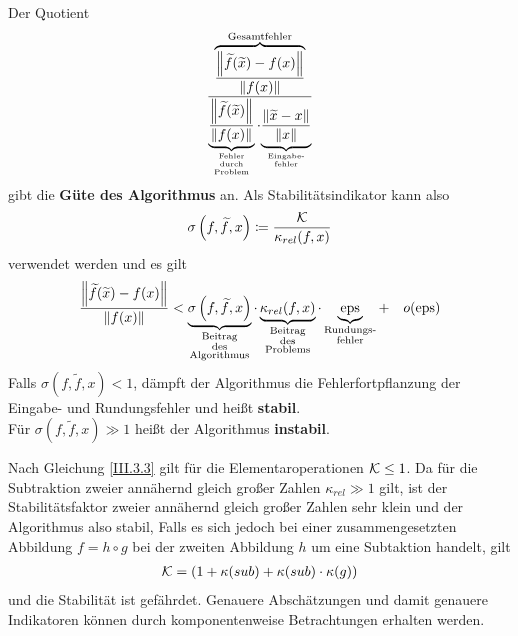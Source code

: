 \begin{Beme}[Sprechweise]\label{3.3.8}
  Der Quotient 
  \begin{gather}
    \frac{\overbrace{\frac{\nn[\widetilde{f}(\widetilde{x})-f(x)]}{\nn[f(x)]}}^{
        \text{Gesamtfehler}}}
    {\underbrace{\frac{\nn[\widetilde{f}(\widetilde{x})]}{\nn[f(x)]}}_{
        \scriptsize\substack{
          \text{Fehler} \\
          \text{durch} \\
          \text{Problem}
        }}
      \cdot
      {\underbrace{\frac{\nn[\widetilde{x}-x]}{\nn[x]}}_{
          \scriptsize\substack{\text{Eingabe-} \\ \text{fehler}}}}}
    \label{III.3.6}
  \end{gather}
  gibt die \textbf{Güte des Algorithmus}  an.
  Als Stabilitätsindikator kann also 
  \begin{gather}
    \sigma\left(f, \widetilde{f}, x\right) \coloneqq \frac{\K}{\kappa_{rel}(f, x)}
    \label{III.3.7}
  \end{gather}
  verwendet werden und es gilt
  \begin{gather*}
    \frac{\nn[\widetilde{f}(\widetilde{x})-f(x)]}{\nn[f(x)]}
    < \underbrace{\sigma\left( f,\widetilde{f}, x\right) }_{
      \substack{\text{Beitrag}\\
        \text{des} \\
        \text{Algorithmus}}}
    \cdot \underbrace{\kappa_{rel}(f,x)}_{
      \substack{\text{Beitrag} \\
        \text{des} \\
        \text{Problems}}}
    \cdot \underbrace{\Eps}_{\substack{\text{Rundungs-}\\\text{fehler}}}
    + \quad o(\Eps)
  \end{gather*}
  Falls $\sigma( f,\widetilde{f}, x)  < 1$, dämpft der Algorithmus die Fehlerfortpflanzung der Eingabe- und Rundungsfehler und heißt \textbf{stabil}. \\
  Für $\sigma( f,\widetilde{f}, x)  \gg 1$ heißt der Algorithmus \textbf{instabil}.
\end{Beme}



\begin{Bspe}
  Nach Gleichung \eqref{III.3.3} gilt für die Elementaroperationen $\K\leq 1$.
  Da für die Subtraktion zweier annähernd gleich großer Zahlen $\kappa_{rel}\gg 1$ gilt,
  ist der Stabilitätsfaktor zweier annähernd gleich großer
  Zahlen sehr klein und der Algorithmus also stabil,
  Falls es sich jedoch bei einer zusammengesetzten Abbildung $f=h\circ g$
  bei der zweiten Abbildung $h$ um eine Subtaktion handelt, gilt
  \begin{gather*}
    \K =(1+\kappa(sub)+\kappa(sub)\cdot\kappa(g))
  \end{gather*}
  und die Stabilität ist gefährdet.
  Genauere Abschätzungen und damit genauere Indikatoren
  können durch komponentenweise Betrachtungen erhalten werden.
\end{Bspe}


